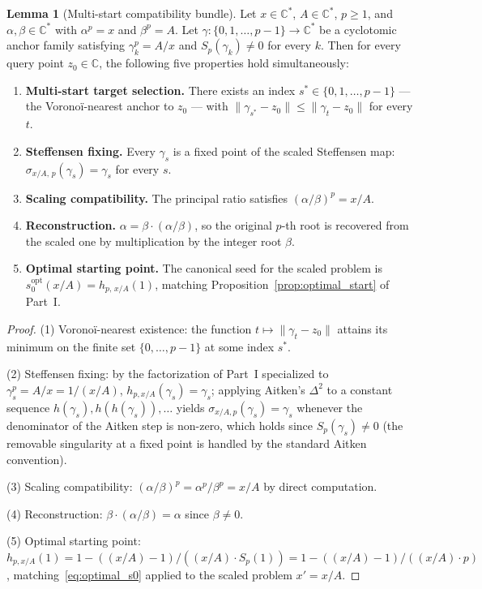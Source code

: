 \documentclass[11pt,a4paper]{article}
\theoremstyle{definition}
\newtheorem{lemma}[theorem]{Lemma}
\begin{document}
\begin{lemma}[Multi-start compatibility bundle]\label{thm:grand-master}
Let $x \in \mathbb{C}^\ast$, $A \in \mathbb{C}^\ast$, $p \geq 1$, and $\alpha, \beta \in \mathbb{C}^\ast$ with $\alpha^p = x$ and $\beta^p = A$. Let $\gamma : \{0, 1, \ldots, p-1\} \to \mathbb{C}^\ast$ be a cyclotomic anchor family satisfying $\gamma_k^p = A/x$ and $S_p(\gamma_k) \neq 0$ for every $k$. Then for every query point $z_0 \in \mathbb{C}$, the following five properties hold simultaneously:
\begin{enumerate}
  \item[(1)] \textbf{Multi-start target selection.} There exists an index $s^\ast \in \{0, 1, \ldots, p-1\}$ --- the Voronoï-nearest anchor to $z_0$ --- with $\|\gamma_{s^\ast} - z_0\| \leq \|\gamma_t - z_0\|$ for every $t$.
  \item[(2)] \textbf{Steffensen fixing.} Every $\gamma_s$ is a fixed point of the scaled Steffensen map: $\sigma_{x/A,\,p}(\gamma_s) = \gamma_s$ for every $s$.
  \item[(3)] \textbf{Scaling compatibility.} The principal ratio satisfies $(\alpha/\beta)^p = x/A$.
  \item[(4)] \textbf{Reconstruction.} $\alpha = \beta \cdot (\alpha/\beta)$, so the original $p$-th root is recovered from the scaled one by multiplication by the integer root $\beta$.
  \item[(5)] \textbf{Optimal starting point.} The canonical seed for the scaled problem is $s_0^{\mathrm{opt}}(x/A) = h_{p,\,x/A}(1)$, matching Proposition~\ref{prop:optimal_start} of Part~I.
\end{enumerate}
\end{lemma}

\begin{proof}
(1) Voronoï-nearest existence: the function $t \mapsto \|\gamma_t - z_0\|$ attains its minimum on the finite set $\{0, \ldots, p-1\}$ at some index $s^\ast$.

(2) Steffensen fixing: by the factorization of Part~I specialized to $\gamma_s^p = A/x = 1/(x/A)$, $h_{p, x/A}(\gamma_s) = \gamma_s$; applying Aitken's $\Delta^2$ to a constant sequence $h(\gamma_s), h(h(\gamma_s)), \ldots$ yields $\sigma_{x/A, p}(\gamma_s) = \gamma_s$ whenever the denominator of the Aitken step is non-zero, which holds since $S_p(\gamma_s) \neq 0$ (the removable singularity at a fixed point is handled by the standard Aitken convention).

(3) Scaling compatibility: $(\alpha/\beta)^p = \alpha^p/\beta^p = x/A$ by direct computation.

(4) Reconstruction: $\beta \cdot (\alpha/\beta) = \alpha$ since $\beta \neq 0$.

(5) Optimal starting point: $h_{p, x/A}(1) = 1 - ((x/A) - 1)/((x/A) \cdot S_p(1)) = 1 - ((x/A) - 1)/((x/A) \cdot p)$, matching~\eqref{eq:optimal_s0} applied to the scaled problem $x' = x/A$.
\end{proof}
\end{document}
